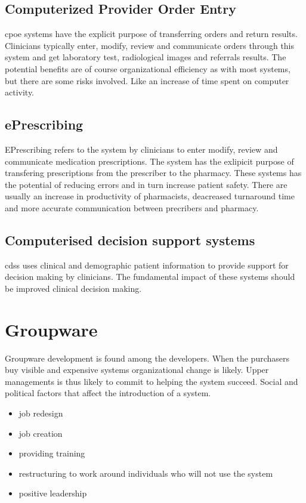 \subsection{Computerized Provider Order Entry}
\gls{cpoe} systems have the explicit purpose of transferring orders and return results.
Clinicians typically enter, modify, review and communicate orders through this system and get laboratory test, radiological images and referrals results. 
The potential benefits are of course organizational efficiency as with most systems, but there are some risks involved. Like an increase of time spent on computer activity.



\subsection{ePrescribing}
EPrescribing refers to the system by clinicians to enter modify, review and communicate medication prescriptions. 
The system has the exlipicit purpose of transfering prescriptions from the prescriber to the pharmacy.
These systems has the potential of reducing errors and in turn increase patient safety. 
There are usually an increase in productivity of pharmacists, deacreased turnaround time and more accurate communication between precribers and pharmacy. 


\subsection{Computerised decision support systems}
\gls{cdss} uses clinical and demographic patient information to provide support for decision making by clinicians. The fundamental impact of these systems should be improved clinical decision making.


\section{Groupware}
Groupware development is found among the developers.
When the purchasers buy visible and expensive systems organizational change is likely.
Upper managements is thus likely to commit to helping the system succeed.
Social and political factors that affect the introduction of a system.

\begin{itemize}
\item job redesign 
\item job creation
\item providing training
\item restructuring to work around individuals who will not use the system
\item positive leadership
\end{itemize}

